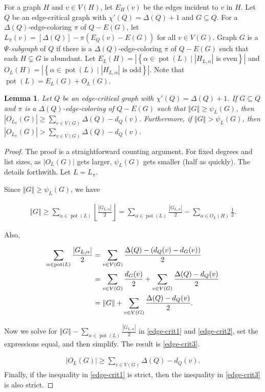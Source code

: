 \documentclass[12pt]{article}
\theoremstyle{plain}
\newtheorem{lem}[thm]{Lemma}
\theoremstyle{definition}
\theoremstyle{remark}
\newcommand{\setb}[3]{\left\{ #1 \in #2 \mid #3 \right\}}
\newcommand{\card}[1]{\left|#1\right|}
\newcommand{\size}[1]{\left\Vert#1\right\Vert}
\newcommand{\floor}[1]{\left\lfloor#1\right\rfloor}
\newcommand{\irange}[1]{\left[#1\right]}
\newcommand{\parens}[1]{\left( #1 \right)}
\newcommand{\pot}{\operatorname{pot}}
\begin{document}
For a graph $H$ and $v \in V(H)$, let $E_H(v)$ be the edges incident to $v$ in $H$. Let $Q$ be an edge-critical graph with $\chi'(Q) = \Delta(Q) + 1$ and $G
\subseteq Q$.  For a $\Delta(Q)$-edge-coloring $\pi$ of $Q - E(G)$, let
$L_\pi(v) = \irange{\Delta(Q)} - \pi\parens{E_Q(v) - E(G)}$ for all $v \in
V(G)$.  Graph $G$ is a \emph{$\Psi$-subgraph} of $Q$ if there is a
$\Delta(Q)$-edge-coloring $\pi$ of $Q - E(G)$ such that each $H \subsetneq G$
is abundant. Let $E_{L}(H) = \card{\setb{\alpha}{\pot(L)}{\card{H_{L, \alpha}}
\text{ is even}}}$ and $O_{L}(H) = \card{\setb{\alpha}{\pot(L)}{\card{H_{L,
\alpha}} \text{ is odd}}}$.  Note that $\pot(L) = E_{L}(G) + O_{L}(G)$.

\begin{lem}\label{LowPsiGivesManyOddColors}
Let $Q$ be an edge-critical graph with $\chi'(Q) = \Delta(Q) + 1$. If $G
\subseteq Q$ and $\pi$ is a $\Delta(Q)$-edge-coloring of $Q - E(G)$ such that
$\size{G}\ge \psi_L(G) $, then $\card{O_{L_\pi}(G)} \ge \sum_{v \in V(G)}
\Delta(Q) - d_Q(v)$.  Furthermore, if $\size{G} > \psi_L(G)$, then
$\card{O_{L_\pi}(G)} > \sum_{v \in V(G)} \Delta(Q) - d_Q(v)$.
\end{lem}
\begin{proof}
The proof is a straightforward counting argument.  For fixed degrees and list
sizes, as $\card{O_L(G)}$ gets larger, $\psi_L(G)$ gets smaller (half as
quickly).  The details forthwith.  Let $L = L_\pi$.

Since $\size{G} \ge \psi_L(G)$, we have 

\begin{align}
\label{edge-crit1}
\size{G} \ge 
\sum_{\alpha \in \pot(L)} \floor{\frac{\card{G_{L, \alpha}}}{2}}  =
\sum_{\alpha \in \pot(L)} \frac{\card{G_{L, \alpha}}}{2} -  \sum_{\alpha \in
	O_L(H)} \frac12 
.\end{align}
	
\noindent 
Also,

\begin{align}
\sum_{\alpha \in \pot(L)} \frac{\card{G_{L, \alpha}}}{2} 
&= \sum_{v \in V(G)} \frac{\Delta(Q) - (d_Q(v)-d_G(v))}{2} \notag\\
&= \sum_{v \in V(G)} \frac{d_G(v)}{2} + \sum_{v \in V(G)} \frac{\Delta(Q) - d_Q(v)}{2}\notag\\
&= \size{G} +  \sum_{v \in V(G)} \frac{\Delta(Q) - d_Q(v)}{2}.
\label{edge-crit2}
\end{align}
	
\noindent Now we solve for $\size{G}-
\sum_{\alpha \in \pot(L)} \frac{\card{G_{L, \alpha}}}{2}$ in 
\eqref{edge-crit1} and \eqref{edge-crit2}, set the expressions equal, and then
simplify.  The result is \eqref{edge-crit3}.
	
\begin{align}
\card{O_L(G)} \ge \sum_{v \in V(G)} \Delta(Q) - d_Q(v).
\label{edge-crit3}
\end{align}
Finally, if the inequality in \eqref{edge-crit1} is strict, then the inequality
in \eqref{edge-crit3} is also strict.
\end{proof}
\end{document}

